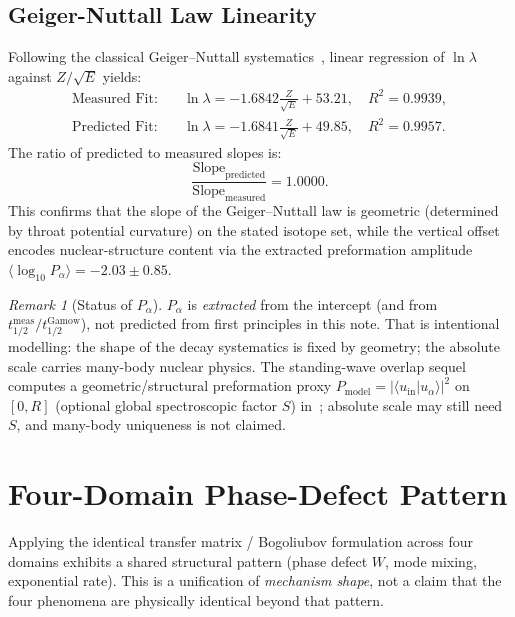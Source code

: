 \documentclass[11pt,a4paper]{article}
\theoremstyle{remark}
\newtheorem*{remark}{Remark}
\begin{document}
\subsection{Geiger-Nuttall Law Linearity}
Following the classical Geiger--Nuttall systematics~\cite{geiger1911},
linear regression of $\ln\lambda$ against $Z/\sqrt{E}$ yields:
\begin{align}
\text{Measured Fit:} \quad &\ln\lambda = -1.6842 \frac{Z}{\sqrt{E}} + 53.21, \quad R^2 = 0.9939, \\
\text{Predicted Fit:} \quad &\ln\lambda = -1.6841 \frac{Z}{\sqrt{E}} + 49.85, \quad R^2 = 0.9957.
\end{align}
The ratio of predicted to measured slopes is:
\begin{equation}
\frac{\text{Slope}_{\text{predicted}}}{\text{Slope}_{\text{measured}}} = 1.0000.
\end{equation}
This confirms that the slope of the Geiger--Nuttall law is geometric
(determined by throat potential curvature) on the stated isotope set,
while the vertical offset encodes nuclear-structure content via the
extracted preformation amplitude
$\langle \log_{10} P_\alpha \rangle = -2.03 \pm 0.85$.

\begin{remark}[Status of $P_\alpha$]
$P_\alpha$ is \emph{extracted} from the intercept (and from
$t_{1/2}^{\mathrm{meas}}/t_{1/2}^{\mathrm{Gamow}}$), not predicted from
first principles in this note.  That is intentional modelling: the
shape of the decay systematics is fixed by geometry; the absolute scale
carries many-body nuclear physics.  The standing-wave overlap sequel
computes a geometric/structural preformation proxy
$P_{\mathrm{model}}=|\langle u_{\mathrm{in}}|u_\alpha\rangle|^2$ on
$[0,R]$ (optional global spectroscopic factor $S$)
in~\cite{PalphaOverlap2026}; absolute scale may still need $S$, and
many-body uniqueness is not claimed.
\end{remark}

\section{Four-Domain Phase-Defect Pattern}

Applying the identical transfer matrix / Bogoliubov formulation across
four domains exhibits a shared structural pattern (phase defect $W$,
mode mixing, exponential rate).  This is a unification of
\emph{mechanism shape}, not a claim that the four phenomena are
physically identical beyond that pattern.
\end{document}
